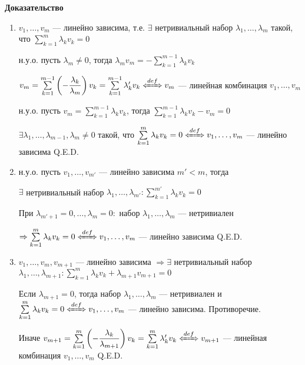 \textbf{Доказательство}

\begin{enumerate}
    \item
          \fbox{\(\Rightarrow\)} \(v_1, \ldots, v_m\) --- линейно зависима, т.е. \(\exists\) нетривиальный набор \(\lambda_1, \ldots, \lambda_m\) такой, что \(\sum\limits_{k = 1}^{m} \lambda_k v_k = 0\)

          н.у.о. пусть \(\lambda_m \neq 0\), тогда \(\lambda_m v_m = -\sum\limits_{k = 1}^{m - 1} \lambda_k v_k\)

          \(v_m = \sum\limits_{k = 1}^{m - 1} \left(- \dfrac{\lambda_k}{\lambda_m} \right) v_k = \sum\limits_{k = 1}^{m - 1} \lambda_k' v_k \defLeftrightarrow v_m \) --- линейная комбинация \(v_1, \ldots, v_m\)

          \fbox{\(\Leftarrow\)} н.у.о. пусть \(v_m = \sum\limits_{k = 1}^{m - 1} \lambda_k v_k\), тогда \(\sum\limits_{k = 1}^{m - 1} \lambda_k v_k - v_m = 0\)

          \(\exists \lambda_1, \ldots, \lambda_{m - 1}, \lambda_m \neq 0\) такой, что \(\sum\limits_{k = 1}^{m} \lambda_k v_k = 0 \defLeftrightarrow v_1, \ldots, v_m \) --- линейно зависима \hfill Q.E.D.


    \item

          н.у.о. пусть \(v_1, \ldots, v_{m'}\) --- линейно зависима \(m' < m\), тогда

          \(\exists\) нетривиальный набор \(\lambda_1, \ldots, \lambda_{m'}: \sum\limits_{k = 1}^{m'} \lambda_k v_k = 0\)

          При \(\lambda_{m' + 1} = 0, \ldots, \lambda_m = 0:\) набор \(\lambda_1, \ldots, \lambda_m\) --- нетривиален

          \(\Rightarrow  \sum\limits_{k = 1}^{m} \lambda_k v_k = 0 \defLeftrightarrow v_1, \ldots, v_m\) --- линейно зависима \hfill Q.E.D.

    \item

          \(v_1, \ldots, v_m, v_{m + 1}\) --- линейно зависима \(\Rightarrow \exists\) нетривиальный набор \(\lambda_1, \ldots, \lambda_{m + 1}: \sum\limits_{k = 1}^{m} \lambda_k v_k + \lambda_{m+1} v_{m+1} = 0\)

          Если \(\lambda_{m + 1} = 0\), тогда набор \(\lambda_1, \ldots, \lambda_m\) --- нетривиален и \(\sum\limits_{k = 1}^{m} \lambda_k v_k = 0 \defLeftrightarrow v_1, \ldots, v_m \) --- линейно зависима. Противоречие.

          Иначе \(v_{m+1} = \sum\limits_{k = 1}^{m} \left( - \dfrac{\lambda_k}{\lambda_{m + 1}} \right) v_k = \sum\limits_{k = 1}^{m} \lambda_k' v_k \defLeftrightarrow v_{m + 1}\) --- линейная комбинация \(v_1, \ldots, v_m\) \hfill Q.E.D.
\end{enumerate}

